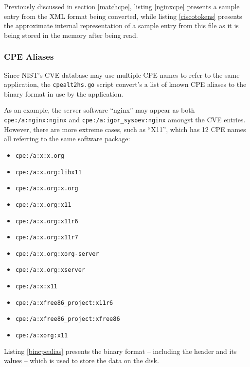 \documentclass[a4paper,12pt]{article}
\begin{document}
	Previously discussed in section \ref{matchcpe}, listing \ref{nginxcpe} presents a sample entry from the XML format being converted, while listing \ref{ciscotokens} presents the approximate internal representation of a sample entry from this file as it is being stored in the memory after being read.

\subsubsection{CPE Aliases}
 

	Since NIST's CVE database may use multiple CPE names to refer to the same application, the \texttt{cpealt2hs.go} script convert's a list of known CPE aliases to the binary format in use by the application.
	
	As an example, the server software ``nginx'' may appear as both \texttt{cpe:/a:nginx:nginx} and \texttt{cpe:/a:igor_sysoev:nginx} amongst the CVE entries. However, there are more extreme cases, such as ``X11'', which has 12 CPE names all referring to the same software package:
	
	\begingroup
	\linespread{1}
	\setlength{\parskip}{0em}
	\begin{itemize}
		\item \texttt{cpe:/a:x:x.org}
		\item \texttt{cpe:/a:x.org:libx11}
		\item \texttt{cpe:/a:x.org:x.org}
		\item \texttt{cpe:/a:x.org:x11}
		\item \texttt{cpe:/a:x.org:x11r6}
		\item \texttt{cpe:/a:x.org:x11r7}
		\item \texttt{cpe:/a:x.org:xorg-server}
		\item \texttt{cpe:/a:x.org:xserver}
		\item \texttt{cpe:/a:x:x11}
		\item \texttt{cpe:/a:xfree86_project:x11r6}
		\item \texttt{cpe:/a:xfree86_project:xfree86}
		\item \texttt{cpe:/a:xorg:x11}
	\end{itemize}
	\endgroup
		
	Listing \ref{bincpealias} presents the binary format -- including the header and its values -- which is used to store the data on the disk.
	
\end{document}
